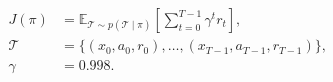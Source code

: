 \documentclass[border=7pt]{standalone}
\begin{document}
\color{ink}
$\displaystyle \begin{aligned}
J(\pi)&=\mathbb E_{\mathcal T\sim p(\mathcal T\mid\pi)}
\!\left[\sum_{t=0}^{T-1}\gamma^t r_t\right],\\[5pt]
\mathcal T&=\{(x_0,a_0,r_0),\ldots,(x_{T-1},a_{T-1},r_{T-1})\},\\[3pt]
\gamma&=0.998.
\end{aligned}$
\end{document}
